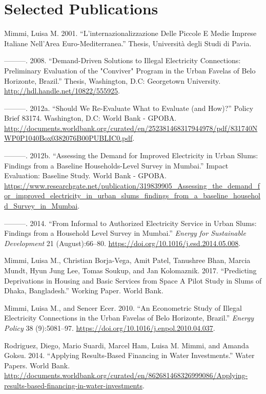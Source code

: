 \documentclass[]{article}
\begin{document}
\hypertarget{selected-publications}{%
\section*{Selected Publications}\label{selected-publications}}

\hypertarget{refs}{}
\leavevmode\hypertarget{ref-mimmi_linternazionalizzazione_2001}{}%
Mimmi, Luisa M. 2001. ``L'internazionalizzazione Delle Piccole E Medie
Imprese Italiane Nell'Area Euro-Mediterranea.'' Thesis, Università degli
Studi di Pavia.

\leavevmode\hypertarget{ref-mimmi_demand-driven_2008}{}%
---------. 2008. ``Demand-Driven Solutions to Illegal Electricity
Connections: Preliminary Evaluation of the "Conviver" Program in the
Urban Favelas of Belo Horizonte, Brazil.'' Thesis, Washington, D.C:
Georgetown University. \url{http://hdl.handle.net/10822/555925}.

\leavevmode\hypertarget{ref-mimmi_should_2012}{}%
---------. 2012a. ``Should We Re-Evaluate What to Evaluate (and How)?''
Policy Brief 83174. Washington, D.C: World Bank - GPOBA.
\url{http://documents.worldbank.org/curated/en/252381468317944978/pdf/831740NWP0P1040Box0382076B00PUBLIC0.pdf}.

\leavevmode\hypertarget{ref-mimmi_assessing_2012}{}%
---------. 2012b. ``Assessing the Demand for Improved Electricity in
Urban Slums: Findings from a Baseline Households-Level Survey in
Mumbai.'' Impact Evaluation: Baseline Study. World Bank - GPOBA.
\url{https://www.researchgate.net/publication/319839905_Assessing_the_demand_for_improved_electricity_in_urban_slums_findings_from_a_baseline_household_Survey_in_Mumbai}.

\leavevmode\hypertarget{ref-mimmi_informal_2014}{}%
---------. 2014. ``From Informal to Authorized Electricity Service in
Urban Slums: Findings from a Household Level Survey in Mumbai.''
\emph{Energy for Sustainable Development} 21 (August):66--80.
\url{https://doi.org/10.1016/j.esd.2014.05.008}.

\leavevmode\hypertarget{ref-mimmi_predicting_2017}{}%
Mimmi, Luisa M., Christian Borja-Vega, Amit Patel, Tanushree Bhan,
Marcia Mundt, Hyun Jung Lee, Tomas Soukup, and Jan Kolomaznik. 2017.
``Predicting Deprivations in Housing and Basic Services from Space A
Pilot Study in Slums of Dhaka, Bangladesh.'' Working Paper. World Bank.

\leavevmode\hypertarget{ref-mimmi_econometric_2010}{}%
Mimmi, Luisa M., and Sencer Ecer. 2010. ``An Econometric Study of
Illegal Electricity Connections in the Urban Favelas of Belo Horizonte,
Brazil.'' \emph{Energy Policy} 38 (9):5081--97.
\url{https://doi.org/10.1016/j.enpol.2010.04.037}.

\leavevmode\hypertarget{ref-rodriguez_applying_2014}{}%
Rodriguez, Diego, Mario Suardi, Marcel Ham, Luisa M. Mimmi, and Amanda
Goksu. 2014. ``Applying Results-Based Financing in Water Investments.''
Water Papers. World Bank.
\url{http://documents.worldbank.org/curated/en/862681468326999086/Applying-results-based-financing-in-water-investments}.
\end{document}
